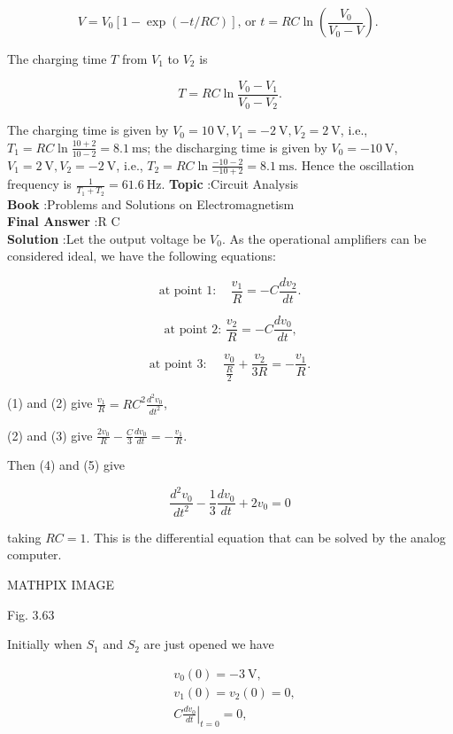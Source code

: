 \documentclass[10pt]{article}
\begin{document}
$$
V=V_{0}[1-\exp (-t / R C)] \text {, or } t=R C \ln \left(\frac{V_{0}}{V_{0}-V}\right) \text {. }
$$

The charging time $T$ from $V_{1}$ to $V_{2}$ is

$$
T=R C \ln \frac{V_{0}-V_{1}}{V_{0}-V_{2}} .
$$

The charging time is given by $V_{0}=10 \mathrm{~V}, V_{1}=-2 \mathrm{~V}, V_{2}=2 \mathrm{~V}$, i.e., $T_{1}=R C \ln \frac{10+2}{10-2}=8.1 \mathrm{~ms}$; the discharging time is given by $V_{0}=-10 \mathrm{~V}$, $V_{1}=2 \mathrm{~V}, V_{2}=-2 \mathrm{~V}$, i.e., $T_{2}=R C \ln \frac{-10-2}{-10+2}=8.1 \mathrm{~ms}$. Hence the oscillation frequency is $\frac{1}{T_{1}+T_{2}}=61.6 \mathrm{~Hz}$.
\textbf{Topic} :Circuit Analysis\\
\textbf{Book} :Problems and Solutions on Electromagnetism\\
\textbf{Final Answer} :R C \ln {}\\


\textbf{Solution} :Let the output voltage be $V_{0}$. As the operational amplifiers can be considered ideal, we have the following equations:

$$
\text { at point } 1: \quad \frac{v_{1}}{R}=-C \frac{d v_{2}}{d t} \text {. }
$$



$$
\text { at point 2: } \frac{v_{2}}{R}=-C \frac{d v_{0}}{d t} \text {, }
$$

$$
\text { at point 3: } \quad \frac{v_{0}}{\frac{R}{2}}+\frac{v_{2}}{3 R}=-\frac{v_{1}}{R} \text {. }
$$

(1) and (2) give $\frac{v_{1}}{R}=R C^{2} \frac{d^{2} v_{0}}{d t^{2}}$,

(2) and (3) give $\frac{2 v_{0}}{R}-\frac{C}{3} \frac{d v_{0}}{d t}=-\frac{v_{1}}{R}$.

Then (4) and (5) give

$$
\frac{d^{2} v_{0}}{d t^{2}}-\frac{1}{3} \frac{d v_{0}}{d t}+2 v_{0}=0
$$

taking $R C=1$. This is the differential equation that can be solved by the analog computer.

MATHPIX IMAGE

Fig. 3.63

Initially when $S_{1}$ and $S_{2}$ are just opened we have

$$
\begin{aligned}
&v_{0}(0)=-3 \mathrm{~V}, \\
&v_{1}(0)=v_{2}(0)=0, \\
&\left.C \frac{d v_{0}}{d t}\right|_{t=0}=0,
\end{aligned}
$$
\end{document}
